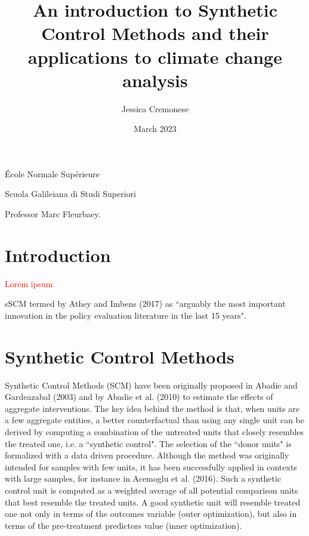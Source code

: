 \documentclass[12pt,a4paper,draft]{article}
\begin{document}
\begin{titlepage}
\title{An introduction to Synthetic Control Methods and their applications to climate change analysis}
\author{Jessica Cremonese}
\date{March 2023}
\maketitle

\vspace{2cm}

\begin{center}
    École Normale Supérieure
\end{center}

\begin{center}
    Scuola Galileiana di Studi Superiori
\end{center}

\vspace{5cm}
Professor Marc Fleurbaey.


\end{titlepage}

\tableofcontents

\newpage


\section{Introduction} %

\textcolor{red}{Lorem ipsum}

sSCM termed by Athey and Imbens (2017) as ``arguably the most important innovation in the 
policy evaluation literature in the last 15 years".




\section{Synthetic Control Methods}

Synthetic Control Methods (SCM) have been originally proposed in Abadie and Gardeazabal 
(2003) and by Abadie et al. (2010) to estimate the effects of aggregate interventions.
The key idea behind the method is that, when units are a few aggregate entities, 
a better counterfactual than using any single unit can be derived by computing a 
combination of the untreated units that closely resembles the treated one, i.e. 
a ``synthetic control". The selection of the ``donor units" is formalized with a data
driven procedure.
Although the method was originally intended for samples with few units, it has been 
successfully applied in contexts with large samples, for instance in Acemoglu et 
al. (2016).
Such a synthetic control unit is computed as a weighted average of all potential 
comparison units that best resemble the treated units. A good synthetic unit will 
resemble treated one not only in terms of the outcomes variable (outer optimization), 
but also in terms of the pre-treatment predictors value (inner optimization).
\end{document}
